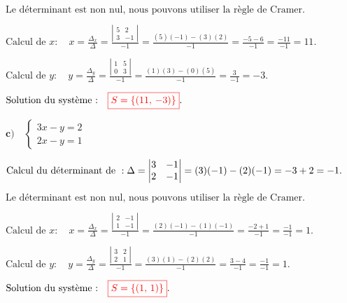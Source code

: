 \documentclass[12pt,a4paper]{article}
\begin{document}
\(
\text{Le déterminant est non nul, nous pouvons utiliser la règle de Cramer.}
\)

\(
\text{Calcul de } x : \quad
x = \frac{\Delta_{x}}{\Delta} = \frac{\left| \begin{matrix} 5 & 2 \\ 3 & -1 \end{matrix} \right|}{-1}
= \frac{(5)(-1) - (3)(2)}{-1} = \frac{-5 - 6}{-1} = \frac{-11}{-1} = 11.
\)

\(
\text{Calcul de } y : \quad
y = \frac{\Delta_{y}}{\Delta} = \frac{\left| \begin{matrix} 1 & 5 \\ 0 & 3 \end{matrix} \right|}{-1}
= \frac{(1)(3) - (0)(5)}{-1} = \frac{3}{-1} = -3.
\)

\(
\text{Solution du système :} \quad
\textcolor{red}{\boxed{S=\left\lbrace  \left( 11, \, -3 \right)  \right\rbrace }}.
\)

\(\textbf{c)} \quad
\begin{cases}
3x - y = 2 \\
2x - y = 1
\end{cases}
\)


\(
\text{Calcul du déterminant de } : \\
\Delta = \left| \begin{matrix} 3 & -1 \\ 2 & -1 \end{matrix} \right| = (3)(-1) - (2)(-1) = -3 + 2 = -1.
\)

\(
\text{Le déterminant est non nul, nous pouvons utiliser la règle de Cramer.}
\)

\(
\text{Calcul de } x : \quad
x = \frac{\Delta_{x}}{\Delta} = \frac{\left| \begin{matrix} 2 & -1 \\ 1 & -1 \end{matrix} \right|}{-1}
= \frac{(2)(-1) - (1)(-1)}{-1} = \frac{-2 + 1}{-1} = \frac{-1}{-1} = 1.
\)

\(
\text{Calcul de } y : \quad
y = \frac{\Delta_{y}}{\Delta} = \frac{\left| \begin{matrix} 3 & 2 \\ 2 & 1 \end{matrix} \right|}{-1}
= \frac{(3)(1) - (2)(2)}{-1} = \frac{3 - 4}{-1} = \frac{-1}{-1} = 1.
\)

\(
\text{Solution du système :} \quad
\textcolor{red}{\boxed{S=\left\lbrace  \left( 1, \, 1 \right)  \right\rbrace }}.
\)
\end{document}
